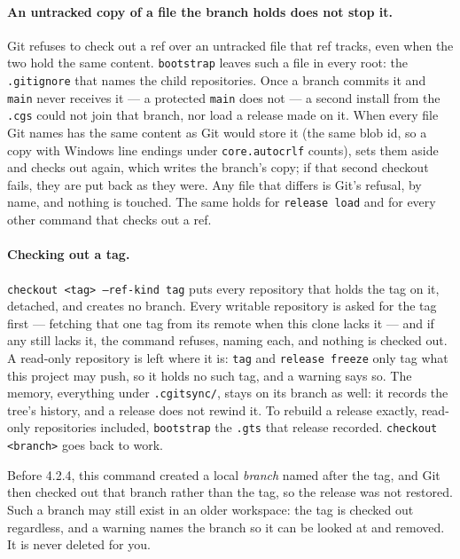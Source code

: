 \paragraph{An untracked copy of a file the branch holds does not stop it.}
Git refuses to check out a ref over an untracked file that ref tracks, even
when the two hold the same content. \texttt{bootstrap} leaves such a file in
every root: the \texttt{.gitignore} that names the child repositories. Once
a branch commits it and \texttt{main} never receives it --- a protected
\texttt{main} does not --- a second install from the \texttt{.cgs} could not
join that branch, nor load a release made on it. When every file Git names
has the same content as Git would store it (the same blob id, so a copy with
Windows line endings under \texttt{core.autocrlf} counts), \cgscli{} sets them
aside and checks out again, which writes the branch's copy; if that second checkout
fails, they are put back as they were. Any file that differs is Git's
refusal, by name, and nothing is touched. The same holds for
\texttt{release load} and for every other command that checks out a ref.

\paragraph{Checking out a tag.} \texttt{checkout <tag> --ref-kind tag} puts
every repository that holds the tag on it, detached, and creates no branch.
Every writable repository is asked for the tag first --- fetching that one
tag from its remote when this clone lacks it --- and if any still lacks it,
the command refuses, naming each, and nothing is checked out. A read-only
repository is left where it is: \texttt{tag} and \texttt{release freeze}
only tag what this project may push, so it holds no such tag, and a warning
says so. The memory, everything under \texttt{.cgitsync/}, stays on its
branch as well: it records the tree's history, and a release does not rewind
it. To rebuild a release exactly, read-only repositories included,
\texttt{bootstrap} the \texttt{.gts} that release recorded.
\texttt{checkout <branch>} goes back to work.

Before 4.2.4, this command created a local \emph{branch} named after the tag,
and Git then checked out that branch rather than the tag, so the release
was not restored. Such a branch may still exist in an older workspace: the
tag is checked out regardless, and a warning names the branch so it can be
looked at and removed. It is never deleted for you.

